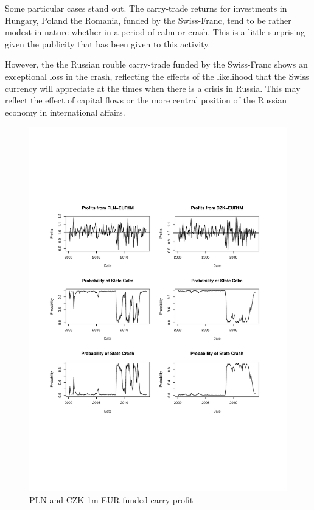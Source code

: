 \documentclass[12pt, a4paper, oneside]{article} %
\begin{document}
Some particular cases stand out. The carry-trade returns for investments in Hungary, Poland the Romania, funded by the Swiss-Franc, tend to be rather modest in nature whether in a period of calm or crash. This is a little surprising given the publicity that has been given to this activity.  

However, the the Russian rouble carry-trade funded by the Swiss-Franc shows an exceptional loss in the crash, reflecting the effects of the likelihood that the Swiss currency will appreciate at the times when there is a crisis in Russia.  This may reflect the effect of capital flows or the more central position of the Russian economy in international affairs. 
 
 
 
\begin{figure}[!h]
\centering
\caption{PLN and CZK 1m EUR funded carry profit}
\includegraphics[scale = .75]{../Figures/2RegProb/PLNCZKEUR.pdf}
\end{figure}
\end{document}

